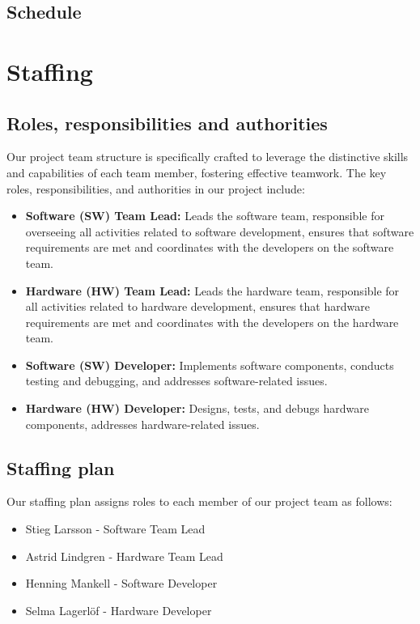 \documentclass[10pt]{projectdoc}
\begin{document}
\subsection{Schedule}

\section{Staffing}
\subsection{Roles, responsibilities and authorities}
Our project team structure is specifically crafted to leverage the distinctive skills and capabilities of each team member, fostering effective teamwork. The key roles, responsibilities, and authorities in our project include:

\begin{itemize}
    \item \textbf{Software (SW) Team Lead:} Leads the software team, responsible for overseeing all activities related to software development, ensures that software requirements are met and coordinates with the developers on the software team.
    \item \textbf{Hardware (HW) Team Lead:} Leads the hardware team, responsible for all activities related to hardware development, ensures that hardware requirements are met and coordinates with the developers on the hardware team.
    \item \textbf{Software (SW) Developer:} Implements software components, conducts testing and debugging, and addresses software-related issues.
    \item \textbf{Hardware (HW) Developer:} Designs, tests, and debugs hardware components, addresses hardware-related issues.
\end{itemize}

\subsection{Staffing plan}
Our staffing plan assigns roles to each member of our project team as follows:

\begin{itemize}
    \item Stieg Larsson - Software Team Lead
    \item Astrid Lindgren - Hardware Team Lead
    \item Henning Mankell - Software Developer
    \item Selma Lagerlöf - Hardware Developer
\end{itemize}
\end{document}
